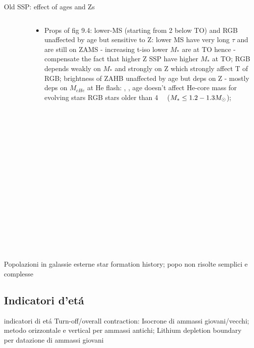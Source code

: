 \begin{frame}{Old SSP: effect of ages and Zs}
\begin{columns}[T]
	\begin{column}{0.4\textwidth}
		\begin{figure}[!ht]
		\texttt{[image: SSP-HDRCMDZpoorMSHB]}
		\end{figure}
	\end{column}
	\begin{column}{0.6\textwidth}
		\begin{itemize}
			\item Props of fig 9.4: lower-MS (starting from \SI{2}{\mag} below TO) and RGB unaffected by age but sensitive to Z: lower MS have very long $\tau$ and are still on ZAMS - increasing t-iso lower $M_*$ are at TO hence  -   compensate the fact that higher Z SSP have higher $M_*$ at TO; RGB depends weakly on $M_*$ and strongly on Z which strongly affect T of RGB; brightness of ZAHB unaffected by age but deps on Z - mostly deps on $M_{cHe}$ at He flash: , , age doesn't affect He-core mass for evolving stars RGB stars older than \SI{4}{\giga\year} ($M_*\leq1.2-1.3M_{\odot}$);
		\end{itemize}
	\end{column}
\end{columns}
\end{frame}

\begin{frame}{Popolazioni in galassie esterne}
star formation history; popo non risolte semplici e complesse
\end{frame}

\subsection{Indicatori d'et\'a}

\begin{frame}{indicatori di et\'a}
Turn-off/overall contraction: Isocrone di ammassi giovani/vecchi; metodo orizzontale e vertical per ammassi antichi; Lithium depletion boundary per datazione di ammassi giovani
\end{frame}


